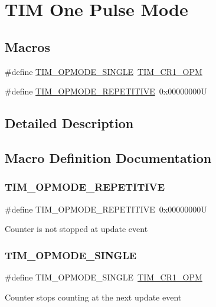 \hypertarget{group___t_i_m___one___pulse___mode}{}\section{T\+IM One Pulse Mode}
\label{group___t_i_m___one___pulse___mode}
\subsection*{Macros}
\begin{DoxyCompactItemize}
\item 
\#define \mbox{\hyperlink{group___t_i_m___one___pulse___mode_gab0447b341024e86145c7ce0dc2931fc6}{T\+I\+M\+\_\+\+O\+P\+M\+O\+D\+E\+\_\+\+S\+I\+N\+G\+LE}}~\mbox{\hyperlink{group___peripheral___registers___bits___definition_ga6d3d1488296350af6d36fbbf71905d29}{T\+I\+M\+\_\+\+C\+R1\+\_\+\+O\+PM}}
\item 
\#define \mbox{\hyperlink{group___t_i_m___one___pulse___mode_ga14a7b6f95769c5b430f65189d9c7cfa3}{T\+I\+M\+\_\+\+O\+P\+M\+O\+D\+E\+\_\+\+R\+E\+P\+E\+T\+I\+T\+I\+VE}}~0x00000000U
\end{DoxyCompactItemize}


\subsection{Detailed Description}


\subsection{Macro Definition Documentation}
\mbox{\label{group___t_i_m___one___pulse___mode_ga14a7b6f95769c5b430f65189d9c7cfa3}} 
\subsubsection{\texorpdfstring{TIM\_OPMODE\_REPETITIVE}{TIM\_OPMODE\_REPETITIVE}}
{\footnotesize\ttfamily \#define T\+I\+M\+\_\+\+O\+P\+M\+O\+D\+E\+\_\+\+R\+E\+P\+E\+T\+I\+T\+I\+VE~0x00000000U}

Counter is not stopped at update event \mbox{\label{group___t_i_m___one___pulse___mode_gab0447b341024e86145c7ce0dc2931fc6}} 
\subsubsection{\texorpdfstring{TIM\_OPMODE\_SINGLE}{TIM\_OPMODE\_SINGLE}}
{\footnotesize\ttfamily \#define T\+I\+M\+\_\+\+O\+P\+M\+O\+D\+E\+\_\+\+S\+I\+N\+G\+LE~\mbox{\hyperlink{group___peripheral___registers___bits___definition_ga6d3d1488296350af6d36fbbf71905d29}{T\+I\+M\+\_\+\+C\+R1\+\_\+\+O\+PM}}}

Counter stops counting at the next update event 
